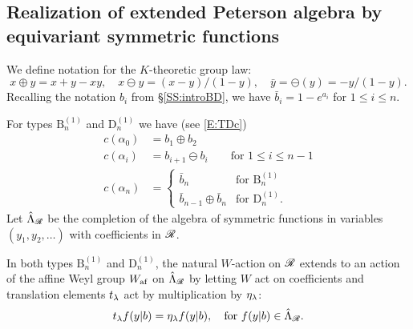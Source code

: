 \documentclass[a4paper]{amsart}
\newcommand{\koushik}[1]{\todo[size=\tiny,color=green!30]{#1}}
\newcommand{\smark}[1]{\todo[size=\tiny,color=cyan!30]{#1}}
\theoremstyle{remark}
\numberwithin{equation}{section}
\begin{document}

\subsection{Realization of extended Peterson algebra by equivariant symmetric functions}
We define notation for the $K$-theoretic group law: $$x\oplus y = x + y - xy,\quad
x\ominus y = (x-y)/(1-y), \quad \bar{y} = \ominus(y) = -y/(1-y).$$ 
Recalling the notation $b_i$ from \S \ref{SS:introBD}, we have
$\bar{b}_i  = 1 - e^{a_i}$ for $1\le i\le n$.

For types $\mathrm{B}_n^{(1)}$ and $\mathrm{D}_n^{(1)}$ we have (see \eqref{E:TDc})
\begin{align*}
    c(\alpha_0) &= b_1 \oplus b_2 \\
    c(\alpha_i) &= b_{i+1} \ominus b_i \qquad\text{for $1\le i\le n-1$} \\
    c(\alpha_n) &= \begin{cases}
        \bar{b}_n & \text{for $\mathrm{B}_n^{(1)}$} \\
        \bar{b}_{n-1} \oplus \bar{b}_n &  \text{for $\mathrm{D}_n^{(1)}$.}
    \end{cases}
\end{align*}
Let $\hat{\Lambda}_{\mathscr{R}}$ be the completion of the algebra of symmetric functions in variables $(y_1,y_2,\dotsc)$ with coefficients in $\mathscr{R}$.



In both types $\mathrm{B}_n^{(1)}$ and $\mathrm{D}_n^{(1)}$, the natural $W$-action on $\mathscr{R}$ extends to an action of the affine Weyl group $W_{\mathrm{af}}$ on $\hat{\Lambda}_{\mathscr{R}}$ by letting $W$ act on coefficients and translation elements $t_\lambda$ act by multiplication by $\eta_{\lambda}$:
\begin{align}\label{eq_t_lam_act}
   t_\lambda f(y| b) = \eta_{\lambda} f(y| b), \quad \text{for $f(y| b) \in \hat{\Lambda}_{\mathscr{R}}$}. 
\end{align}
\end{document}

